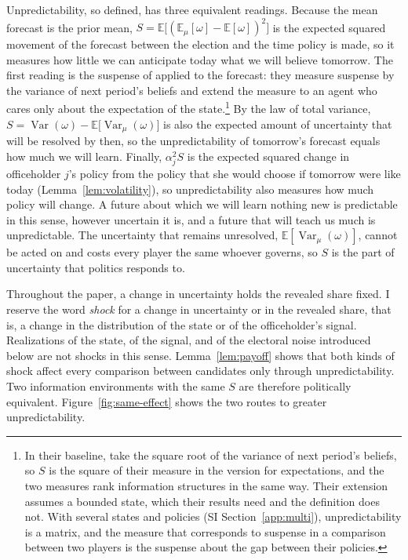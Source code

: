 \documentclass[12pt,letterpaper]{article}
\begin{document}
Unpredictability, so defined, has three equivalent readings. Because the mean forecast is the prior mean, $S=\mathbb{E}\big[(\mathbb{E}_\mu[\omega]-\mathbb{E}[\omega])^2\big]$ is the expected squared movement of the forecast between the election and the time policy is made, so it measures how little we can anticipate today what we will believe tomorrow. The first reading is the suspense of \citet{ElyFrankelKamenica2015} applied to the forecast: they measure suspense by the variance of next period's beliefs and extend the measure to an agent who cares only about the expectation of the state.\footnote{In their baseline, \citet{ElyFrankelKamenica2015} take the square root of the variance of next period's beliefs, so $S$ is the square of their measure in the version for expectations, and the two measures rank information structures in the same way. Their extension assumes a bounded state, which their results need and the definition does not. With several states and policies (SI Section~\ref{app:multi}), unpredictability is a matrix, and the measure that corresponds to suspense in a comparison between two players is the suspense about the gap between their policies.} By the law of total variance, $S=\operatorname{Var}(\omega)-\mathbb{E}\big[\operatorname{Var}_\mu(\omega)\big]$ is also the expected amount of uncertainty that will be resolved by then, so the unpredictability of tomorrow's forecast equals how much we will learn. Finally, $\alpha_j^2S$ is the expected squared change in officeholder $j$'s policy from the policy that she would choose if tomorrow were like today (Lemma~\ref{lem:volatility}), so unpredictability also measures how much policy will change. A future about which we will learn nothing new is predictable in this sense, however uncertain it is, and a future that will teach us much is unpredictable. The uncertainty that remains unresolved, $\mathbb{E}[\operatorname{Var}_\mu(\omega)]$, cannot be acted on and costs every player the same whoever governs, so $S$ is the part of uncertainty that politics responds to.

Throughout the paper, a change in uncertainty holds the revealed share fixed. I reserve the word \emph{shock} for a change in uncertainty or in the revealed share, that is, a change in the distribution of the state or of the officeholder's signal. Realizations of the state, of the signal, and of the electoral noise introduced below are not shocks in this sense. Lemma~\ref{lem:payoff} shows that both kinds of shock affect every comparison between candidates only through unpredictability. Two information environments with the same $S$ are therefore politically equivalent. Figure~\ref{fig:same-effect} shows the two routes to greater unpredictability.
\end{document}
